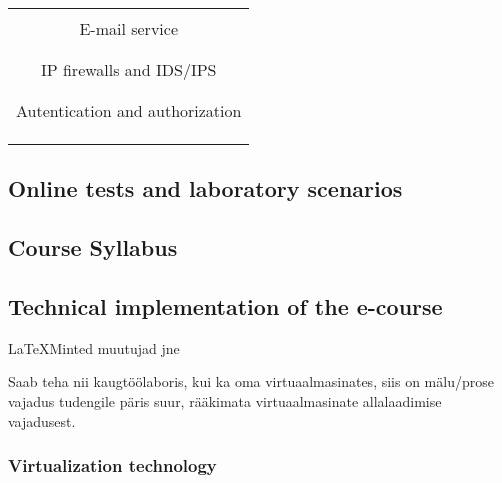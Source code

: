 \begin{table}[H]
\begin{tabular}{|p{5cm}|p{3cm}|p{6cm}|}
\hline 
 & & \\
\hline

\hline
 & & \\
\hline
\hline
  \multicolumn{3}{|c|}{E-mail service} \\
\hline 
 & & \\
\hline

\hline
 & & \\

\hline
\hline
  \multicolumn{3}{|c|}{IP firewalls and IDS/IPS} \\
\hline 
 & & \\
\hline

\hline
 & & \\

\hline
\hline
  \multicolumn{3}{|c|}{Autentication and authorization} \\
\hline 
 & & \\
\hline

\hline
 & & \\

\hline
 & & \\
\hline
\end{tabular} 
\label{table:learning_materials}
\end{table}



\subsection{Online tests and laboratory scenarios}

\subsection{Course Syllabus}

\subsection{Technical implementation of the e-course}

\LaTeX Minted muutujad jne


Saab teha nii kaugtöölaboris, kui ka oma virtuaalmasinates, siis on mälu/prose vajadus tudengile päris suur, rääkimata virtuaalmasinate allalaadimise vajadusest.

\subsubsection{Virtualization technology}

